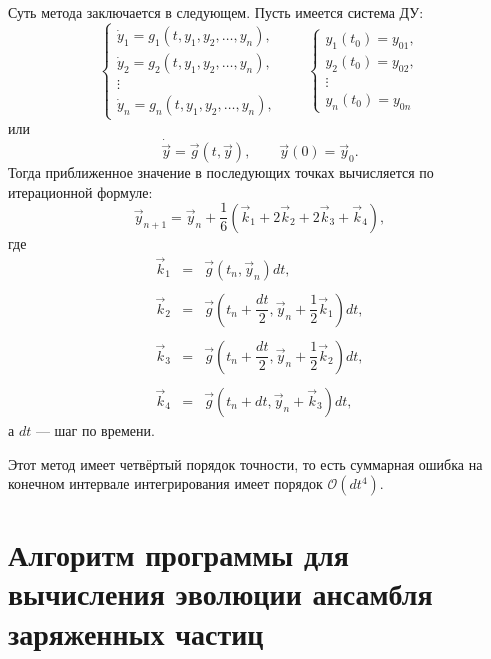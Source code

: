 Суть метода заключается в следующем. Пусть имеется система ДУ:
\begin{equation*}
	\begin{cases}
		\dot{y}_1 = g_1 (t,y_1,y_2,\dots,y_n), \\
		\dot{y}_2 = g_2 (t,y_1,y_2,\dots,y_n), \\
		\vdots \\
		\dot{y}_n = g_n (t,y_1,y_2,\dots,y_n), 
	\end{cases}
	\qquad 
	\begin{cases}
		y_1 (t_0) = y_{01}, \\
		y_2 (t_0) = y_{02}, \\
		\vdots \\
		y_n (t_0) = y_{0n} 
	\end{cases}
\end{equation*}
или
\begin{equation*}
\dot{\vec{y}} = \vec{g} \left(t , \vec{y}\right), \qquad \vec{y}(0) = \vec{y}_0.
\end{equation*}
Тогда приближенное значение в последующих точках вычисляется по итерационной формуле:
\begin{equation}
\vec{y}_{n+1} = \vec{y}_n + \frac{1}{6} \left( \vec{k}_1 + 2 \vec{k}_2 + 2 \vec{k}_3 + \vec{k}_4  \right),
\end{equation}
где 
\begin{eqnarray}
\vec{k}_1 &=& \vec{g}(t_n,\vec{y}_n) dt, \nonumber \\ \nonumber \\
\vec{k}_2 &=& \vec{g}(t_n + \dfrac{dt}{2},\vec{y}_n + \dfrac{1}{2} \vec{k}_1 ) dt, \nonumber \\  \\
\vec{k}_3 &=& \vec{g}(t_n + \dfrac{dt}{2},\vec{y}_n + \dfrac{1}{2} \vec{k}_2 ) dt, \nonumber \\ \nonumber \\
\vec{k}_4 &=& \vec{g}(t_n + dt,\vec{y}_n + \vec{k}_3) dt, \nonumber
\end{eqnarray}
а $dt$ --- шаг по времени.

Этот метод имеет четвёртый порядок точности, то есть суммарная ошибка на конечном интервале интегрирования имеет порядок $\mathscr{O}(d t^4)$.


\chapter{Алгоритм программы для вычисления эволюции ансамбля заряженных частиц} \label{AppendixB}

